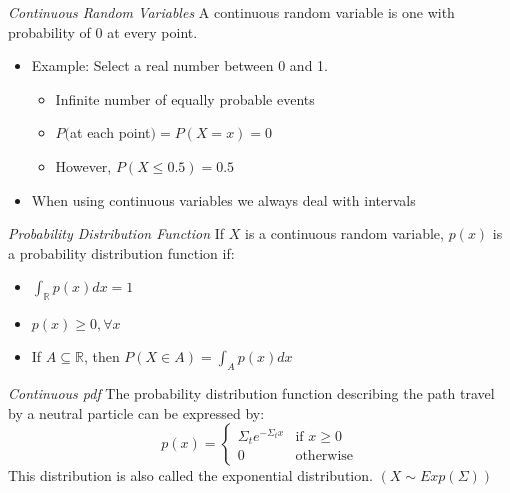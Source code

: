 



\emph{Continuous Random Variables}
 A continuous random variable is one with probability of 0 at every point.
\begin{itemize}
 \item Example: Select a real number between 0 and 1.
   \begin{itemize}
    \item Infinite number of equally probable events
    \item $P($at each point$) = P(X=x) = 0$
    \item However, $P(X \le 0.5) = 0.5$
   \end{itemize}
 \item When using continuous variables we always deal with intervals
\end{itemize}


\emph{Probability Distribution Function}
 If $X$ is a continuous random variable, $p(x)$ is a probability distribution function if:
 \begin{itemize}
  \item $\int_{\mathbb{R}} p(x)dx = 1$
  \item $p(x) \ge 0, \forall x$
  \item If $A \subseteq \mathbb{R}$, then $P(X \in A) = \int_{A}p(x)dx$
 \end{itemize}


\emph{Continuous pdf}
 The probability distribution function describing the path travel by a neutral particle can be expressed by:
     \begin{displaymath}
        p(x) = \left\{ \begin{array}{ll}
                         \Sigma_{t}e^{-\Sigma_{t}x} & \textrm{if $x\ge0$}\\                       
                         0 & \textrm{otherwise}
                       \end{array} \right.
     \end{displaymath}
This distribution is also called the exponential distribution. $(X \sim Exp(\Sigma))$


